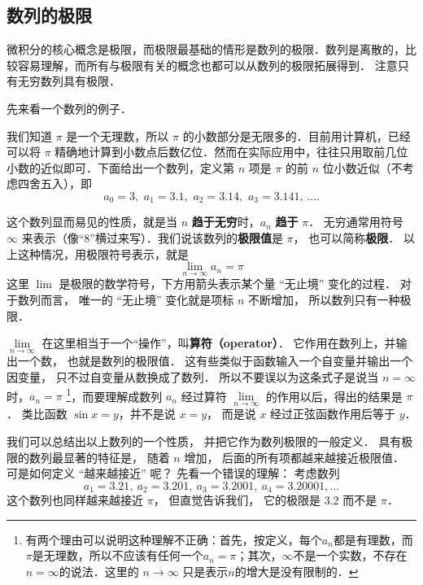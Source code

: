 
\subsection{数列的极限}

微积分的核心概念是极限，而极限最基础的情形是数列的极限．数列是离散的，比较容易理解，而所有与极限有关的概念也都可以从数列的极限拓展得到． 注意只有无穷数列具有极限．

先来看一个数列的例子．

\begin{example}{}\label{Lim_ex1}
我们知道 $\pi$ 是一个无理数，所以 $\pi$ 的小数部分是无限多的．目前用计算机，已经可以将 $\pi$ 精确地计算到小数点后数亿位．然而在实际应用中，往往只用取前几位小数的近似即可．下面给出一个数列，定义第 $n$ 项是 $\pi$ 的前 $n$ 位小数近似（不考虑四舍五入），即
\begin{equation}\label{Lim_eq1}
a_0 = 3,\,\, a_1 = 3.1,\,\, a_2 = 3.14,\,\, a_3 = 3.141,\,\dots.
\end{equation}
\end{example}

这个数列显而易见的性质，就是当 $n$ \textbf{趋于无穷}时，$a_n$ \textbf{趋于} $\pi$． 无穷通常用符号 $\infty$ 来表示（像“8”横过来写）．我们说该数列的\textbf{极限值}是 $\pi$， 也可以简称\textbf{极限}． 以上这种情况，用极限符号表示，就是
\begin{equation}
\lim_{n \to \infty } {a_n} = \pi 
\end{equation}
这里 $\lim$ 是极限的数学符号，下方用箭头表示某个量 “无止境” 变化的过程． 对于数列而言， 唯一的 “无止境” 变化就是项标 $n$ 不断增加， 所以数列只有一种极限．



$\lim\limits_{n \to \infty }$ 在这里相当于一个“操作”，叫\textbf{算符（operator）}． 它作用在数列上，并输出一个数， 也就是数列的极限值． 这有些类似于函数输入一个自变量并输出一个因变量， 只不过自变量从数换成了数列． 所以不要误以为这条式子是说当 $n = \infty$ 时，$a_n=\pi$ \footnote{有两个理由可以说明这种理解不正确：首先，按定义，每个$a_n$都是有理数，而$\pi$是无理数，所以不应该有任何一个$a_n=\pi$；其次，$\infty$不是一个实数，不存在$n=\infty$的说法．这里的 $n\to\infty$ 只是表示$n$的增大是没有限制的．}，而要理解成数列 $a_n$ 经过算符 $\lim\limits_{n \to \infty }$ 的作用以后，得出的结果是 $\pi$． 类比函数 $\sin x = y$，并不是说 $x=y$， 而是说 $x$ 经过正弦函数作用后等于 $y$． 

我们可以总结出以上数列的一个性质， 并把它作为数列极限的一般定义． 具有极限的数列最显著的特征是， 随着 $n$ 增加， 后面的所有项都越来越接近极限值． 可是如何定义 “越来越接近” 呢？ 先看一个错误的理解： 考虑数列
\begin{equation}\label{Lim_eq2}
a_1 = 3.21,\ a_2 = 3.201,\ a_3 = 3.2001,\ a_4 = 3.20001, \dots
\end{equation}
这个数列也同样越来越接近 $\pi$， 但直觉告诉我们， 它的极限是 $3.2$ 而不是 $\pi$．


